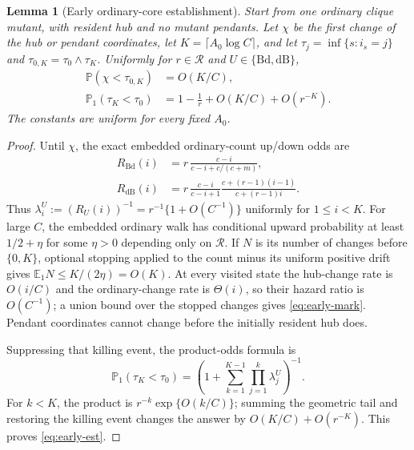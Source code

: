 \documentclass[11pt]{article}
\newtheorem{lemma}[theorem]{Lemma}
\theoremstyle{definition}
\theoremstyle{remark}
\newcommand{\Bd}{\mathrm{Bd}}
\newcommand{\dB}{\mathrm{dB}}
\newcommand{\Prob}{\mathbb P}
\begin{document}
\begin{lemma}[Early ordinary-core establishment]
\label{lem:early-establishment}
Start from one ordinary clique mutant, with resident hub and no mutant
pendants.  Let $\chi$ be the first change of the hub or pendant coordinates,
let $K=\lceil A_0\log C\rceil$, and let
$\tau_j=\inf\{s:i_s=j\}$ and
$\tau_{0,K}=\tau_0\wedge\tau_K$.  Uniformly for
$r\in\mathcal R$ and $U\in\{\Bd,\dB\}$,
\begin{align}
 \Prob(\chi<\tau_{0,K})&=O(K/C),\label{eq:early-mark}\\
 \Prob_1(\tau_K<\tau_0)
 &=1-\frac1r+O(K/C)+O(r^{-K}).\label{eq:early-est}
\end{align}
The constants are uniform for every fixed $A_0$.
\end{lemma}

\begin{proof}
Until $\chi$, the exact embedded ordinary-count up/down odds are
\begin{align}
 R_{\Bd}(i)
 &=r\,\frac{c-i}{c-i+c/(c+m)},\\
 R_{\dB}(i)
 &=r\,\frac{c-i}{c-i+1}
 \frac{c+(r-1)(i-1)}{c+(r-1)i}.
\end{align}
Thus $\lambda_i^U:=(R_U(i))^{-1}=r^{-1}\{1+O(C^{-1})\}$ uniformly for
$1\leq i<K$.  For large $C$, the embedded ordinary walk has conditional
upward probability at least $1/2+\eta$ for some $\eta>0$ depending only on
$\mathcal R$.  If $N$ is its number of changes before $\{0,K\}$, optional
stopping applied to the count minus its uniform positive drift gives
$\mathbb E_1N\leq K/(2\eta)=O(K)$.  At every visited state the hub-change
rate is $O(i/C)$ and the ordinary-change rate is $\Theta(i)$, so their hazard
ratio is $O(C^{-1})$; a union bound over
the stopped changes gives \eqref{eq:early-mark}.  Pendant coordinates cannot
change before the initially resident hub does.

Suppressing that killing event, the product-odds formula is
\[
 \Prob_1(\tau_K<\tau_0)
 =\left(1+\sum_{k=1}^{K-1}\prod_{j=1}^k\lambda_j^U\right)^{-1}.
\]
For $k<K$, the product is
$r^{-k}\exp\{O(k/C)\}$; summing the geometric tail and restoring the
killing event changes the answer by
$O(K/C)+O(r^{-K})$.  This proves \eqref{eq:early-est}.
\end{proof}
\end{document}
